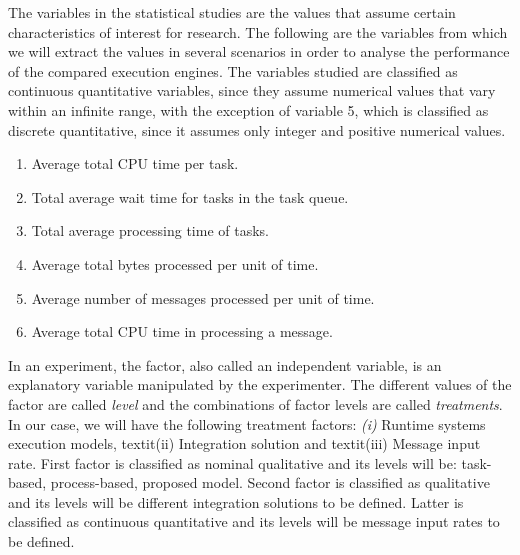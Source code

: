 %

The variables in the statistical studies are the values that assume certain characteristics of interest for research. The following are the variables from which we will extract the values in several scenarios in order to analyse the performance of the compared execution engines. The variables studied are classified as continuous quantitative variables, since they assume numerical values that vary within an infinite range, with the exception of variable 5, which is classified as discrete quantitative, since it assumes only integer and positive numerical values.
\begin{enumerate}
\item Average total CPU time per task.
\item Total average wait time for tasks in the task queue.
\item Total average processing time of tasks.
\item Average total bytes processed per unit of time.
\item Average number of messages processed per unit of time.
\item Average total CPU time in processing a message.
\end{enumerate}
In an experiment, the factor, also called an independent variable, is an explanatory variable manipulated by the experimenter. The different values of the factor are called \textit{level} and the combinations of factor levels are called \textit{treatments}. In our case, we will have the following treatment factors: \textit{(i)} Runtime systems execution models, textit{(ii)} Integration solution and textit{(iii)} Message input rate. First factor is classified as nominal qualitative and its levels will be: task-based, process-based, proposed model. Second factor is classified as qualitative and its levels will be different integration solutions to be defined. Latter is classified as continuous quantitative and its levels will be message input rates to be defined.
